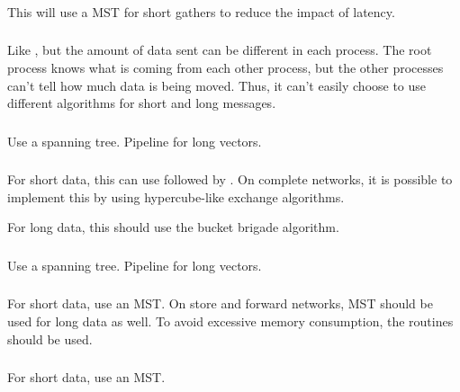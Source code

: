 \documentclass{article}
\begin{document}
\subsubsection{}
This will use a MST for short gathers to reduce the impact of latency.  

\subsubsection{}
Like , but the amount of data sent can be different in
each process.  The root process knows what is coming from each other process,
but the other processes can't tell how much data is being moved.  Thus, it
can't easily choose to use different algorithms for short and long messages.  

\subsubsection{}
Use a spanning tree.  Pipeline for long vectors.

\subsubsection{}
For short data, this can use  followed by
.  On 
complete networks, it is possible to implement this by using hypercube-like
exchange algorithms.

For long data, this should use the bucket brigade algorithm.

\subsubsection{}
Use a spanning tree.  Pipeline for long vectors.

\subsubsection{}
For short data, use an MST. On store and forward networks, MST should be used
for long data as well.  To avoid excessive memory consumption, the
 routines should be used.

\subsubsection{}
For short data, use an MST. 
\end{document}
